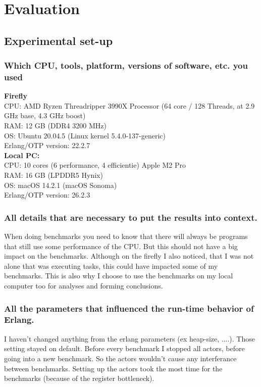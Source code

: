 \documentclass[a4paper]{article}
\begin{document}
\section{Evaluation}
\subsection{Experimental set-up}
\subsubsection{Which CPU, tools, platform, versions of software, etc. you used }
\textbf{Firefly} \\
CPU: AMD Ryzen Threadripper 3990X Processor (64 core / 128 Threads, at 2.9 GHz base, 4.3 GHz boost) \\
RAM: 12 GB (DDR4 3200 MHz) \\
OS: Ubuntu 20.04.5 (Linux kernel 5.4.0-137-generic) \\
Erlang/OTP version: 22.2.7 \\

\textbf{Local PC:} \\
CPU: 10 cores (6 performance, 4 efficientie) Apple M2 Pro \\
RAM: 16 GB (LPDDR5 Hynix) \\
OS: macOS 14.2.1 (macOS Sonoma) \\
Erlang/OTP version: 26.2.3 \\

\subsubsection{ All details that are necessary to put the results into context.}
When doing benchmarks you need to know that there will always be programs that still use some performance of the CPU. But this should not have a big impact on the benchmarks. Although on the firefly I also noticed, that I was not alone that was executing tasks, this could have impacted some of my benchmarks. This is also why I choose to use the benchmarks on my local computer too for analyses and forming conclusions.
\subsubsection{All the parameters that influenced the run-time behavior of Erlang.}
I haven't changed anything from the erlang parameters (ex heap-size, ....). Those setting stayed on default. Before every benchmark I stopped all actors, before going into a new benchmark. So the actors wouldn't cause any interferance between benchmarks. Setting up the actors took the most time for the benchmarks (because of the register bottleneck).
\end{document}
